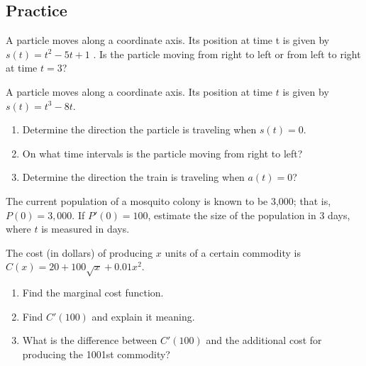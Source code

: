 \subsection{Practice}

\begin{exercise}
  A particle moves along a coordinate axis. Its position at time  t  is given by $s(t)=t^2-5t+1$ . Is the particle moving from right to left or from left to right at time  $t=3$?
\end{exercise}
\vspace*{6\baselineskip}

\begin{exercise}

  A particle moves along a coordinate axis. Its position at time \(t\) is given by
  \(s(t)=t^3-8t\).
  
  \begin{enumerate}
  \item
    Determine the direction the particle is traveling when $s(t)=0$.
  \item
    On what time intervals is the particle moving from right to left?
  \item
    Determine the direction the train is traveling when $a(t)=0$?
  \end{enumerate}
  
\end{exercise}


\begin{exercise}

The current population of a mosquito colony is known to be 3,000; that
is, \(P(0)=3,000\). If \(P'(0)=100\), estimate the size of the
population in 3 days, where \(t\) is measured in days.

\end{exercise}
\vspace*{6\baselineskip}

\begin{exercise}

The cost (in dollars) of producing \(x\) units of a certain commodity is
\(C(x) = 20 + 100\sqrt{x} + 0.01x^2\).

\begin{enumerate}
\item
  Find the marginal cost function.
\item
  Find \(C'(100)\) and explain it meaning.
\item
  What is the difference between \(C'(100)\) and the additional cost for
  producing the 1001st commodity?
\end{enumerate}

\end{exercise}

